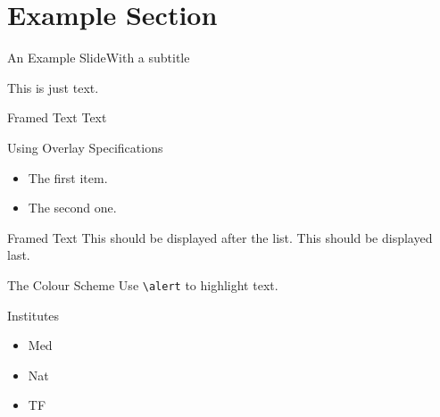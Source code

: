 \section{Example Section}
\begin{frame}[t]{An Example Slide}{With a subtitle}

This is just text.\hfill

\begin{block}{Framed Text}
Text \insertsectionhead
\end{block}
\end{frame}
\begin{frame}{Using Overlay Specifications}
\begin{itemize}[<+(1)->]
\item The first item.
\item The second one.
\end{itemize}
\pause
\begin{block}{Framed Text}
This should be displayed after the list.
\pause
This should be displayed last.
\end{block}
\end{frame}
\begin{frame}{The Colour Scheme}
Use \texttt{\textbackslash alert} to highlight \alert{text}.
\end{frame}

\begin{frame}{Institutes}
\begin{itemize}
\item Med
\item Nat
\item TF
\end{itemize}
\end{frame}